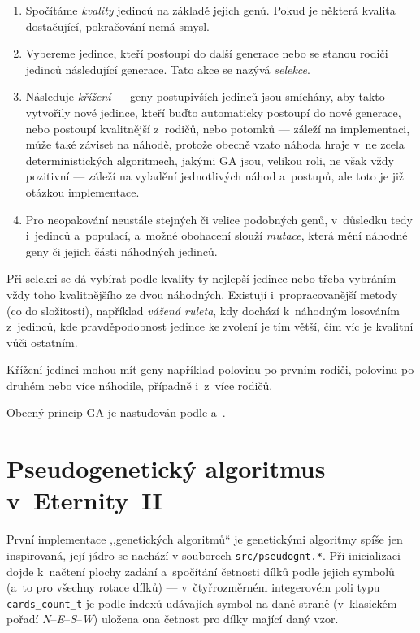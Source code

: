 \documentclass[11pt, titlepage]{report}
\begin{document}
\begin{enumerate}
\item Spočítáme \emph{kvality} jedinců na základě jejich genů. Pokud je některá kvalita dostačující, pokračování nemá smysl.
\item Vybereme jedince, kteří postoupí do další generace nebo se stanou rodiči jedinců následující generace. Tato akce se nazývá \emph{selekce}.
\item Následuje \emph{křížení} --- geny postupivších jedinců jsou smíchány, aby takto vytvořily nové jedince, kteří buďto automaticky postoupí do nové generace, nebo postoupí kvalitnější z~rodičů, nebo potomků --- záleží na implementaci, může také záviset na náhodě, protože obecně vzato náhoda hraje v~ne zcela deterministických algoritmech, jakými GA jsou, velikou roli, ne však vždy pozitivní --- záleží na vyladění jednotlivých náhod a~postupů, ale toto je již otázkou implementace.
\item Pro neopakování neustále stejných či velice podobných genů, v~důsledku tedy i~jedinců a~populací, a~možné obohacení slouží \emph{mutace}, která mění náhodné geny či jejich části náhodných jedinců.
\end{enumerate}

Při selekci se dá vybírat podle kvality ty nejlepší jedince nebo třeba vybráním vždy toho kvalitnějšího ze dvou náhodných. Existují i~propracovanější metody (co do složitosti), například \emph{vážená ruleta}, kdy dochází k~náhodným losováním z~jedinců, kde pravděpodobnost jedince ke zvolení je tím větší, čím víc je kvalitní vůči ostatním.

Křížení jedinci mohou mít geny například polovinu po prvním rodiči, polovinu po druhém nebo více náhodile, případně i~z~více rodičů.

Obecný princip GA je nastudován podle \cite{ga-poli} a~\cite{ga-dipl}.

\section{Pseudogenetický algoritmus v~Eternity~II}
\label{sec:ga-pseudo}

První implementace ,,genetických algoritmů`` je genetickými algoritmy spíše jen inspirovaná, její jádro se nachází v souborech \texttt{src/pseudognt.*}. Při inicializaci dojde k~načtení plochy zadání a~spočítání četnosti dílků podle jejich symbolů (a~to pro všechny rotace dílků) --- v~čtyřrozměrném integerovém poli typu \texttt{cards\_count\_t} je podle indexů udávajích symbol na dané straně (v~klasickém pořadí \emph{N}--\emph{E}--\emph{S}--\emph{W}) uložena ona četnost pro dílky mající daný vzor.
\end{document}
